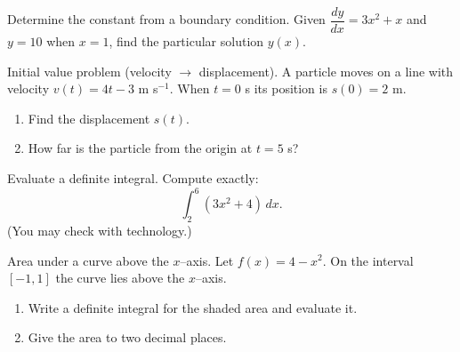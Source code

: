 \documentclass[11pt]{article}
\def\textbf#1{#1}%
\newcounter{question}
\begin{document}
\begin{question}
\textbf{Determine the constant from a boundary condition.}
Given $\dfrac{dy}{dx}=3x^{2}+x$ and $y=10$ when $x=1$, find the particular solution $y(x)$.
\end{question}

\begin{question}
\textbf{Initial value problem (velocity $\to$ displacement).}
A particle moves on a line with velocity $v(t)=4t-3$ m s$^{-1}$. When $t=0$ s its position is $s(0)=2$ m.
\begin{enumerate}
  \item Find the displacement $s(t)$.
  \item How far is the particle from the origin at $t=5$ s?
\end{enumerate}
\end{question}

\begin{question}
\textbf{Evaluate a definite integral.}
Compute exactly:
\[
\int_{2}^{6} (3x^{2}+4)\,dx.
\]
(You may check with technology.)
\end{question}

\begin{question}
\textbf{Area under a curve above the $x$–axis.}
Let $f(x)=4-x^{2}$. On the interval $[-1,1]$ the curve lies above the $x$–axis.
\begin{enumerate}
  \item Write a definite integral for the shaded area and evaluate it.
  \item Give the area to two decimal places.

\begin{center}
\end{center}
\end{enumerate}
\end{question}
\end{document}
